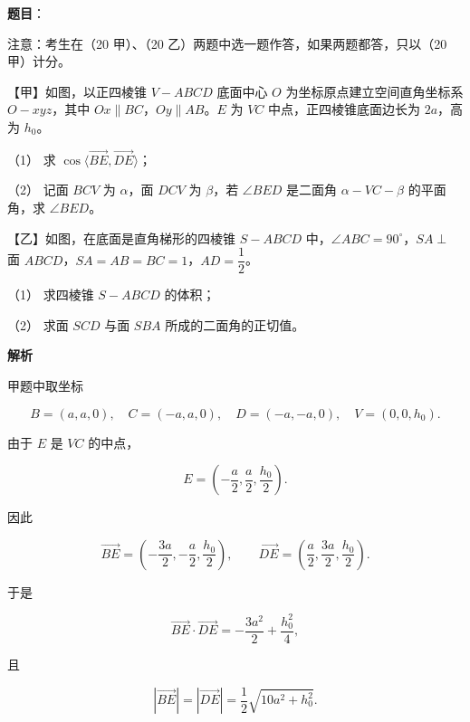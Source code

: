 \begin{answer}

\textbf{题目}：

注意：考生在（20 甲）、（20 乙）两题中选一题作答，如果两题都答，只以（20 甲）计分。

【甲】如图，以正四棱锥 $V-ABCD$ 底面中心 $O$ 为坐标原点建立空间直角坐标系 $O-xyz$，其中 $Ox\parallel BC$，$Oy\parallel AB$。$E$ 为 $VC$ 中点，正四棱锥底面边长为 $2a$，高为 $h_0$。
\nopagebreak[4]
\begin{center}\end{center}
\nopagebreak[4]
（1） 求 $\cos\langle\overrightarrow{BE},\overrightarrow{DE}\rangle$；

（2） 记面 $BCV$ 为 $\alpha$，面 $DCV$ 为 $\beta$，若 $\angle BED$ 是二面角 $\alpha-VC-\beta$ 的平面角，求 $\angle BED$。

【乙】如图，在底面是直角梯形的四棱锥 $S-ABCD$ 中，$\angle ABC=90^\circ$，$SA\perp$ 面 $ABCD$，$SA=AB=BC=1$，$AD=\dfrac12$。
\nopagebreak[4]
\begin{center}\end{center}
\nopagebreak[4]
（1） 求四棱锥 $S-ABCD$ 的体积；

（2） 求面 $SCD$ 与面 $SBA$ 所成的二面角的正切值。

\textbf{解析}


甲题中取坐标

\nopagebreak[4]
\[
B=(a,a,0),\quad C=(-a,a,0),\quad D=(-a,-a,0),\quad
V=(0,0,h_0).
\]

由于 $E$ 是 $VC$ 的中点，

\nopagebreak[4]
\[
E=\left(-\frac a2,\frac a2,\frac{h_0}{2}\right).
\]

因此

\nopagebreak[4]
\[
\overrightarrow{BE}=\left(-\frac{3a}{2},-\frac a2,\frac{h_0}{2}\right),
\qquad
\overrightarrow{DE}=\left(\frac a2,\frac{3a}{2},\frac{h_0}{2}\right).
\]

于是

\nopagebreak[4]
\[
\overrightarrow{BE}\cdot\overrightarrow{DE}
=-\frac{3a^2}{2}+\frac{h_0^2}{4},
\]

且

\nopagebreak[4]
\[
|\overrightarrow{BE}|=|\overrightarrow{DE}|
=\frac12\sqrt{10a^2+h_0^2}.
\]


\end{answer}
